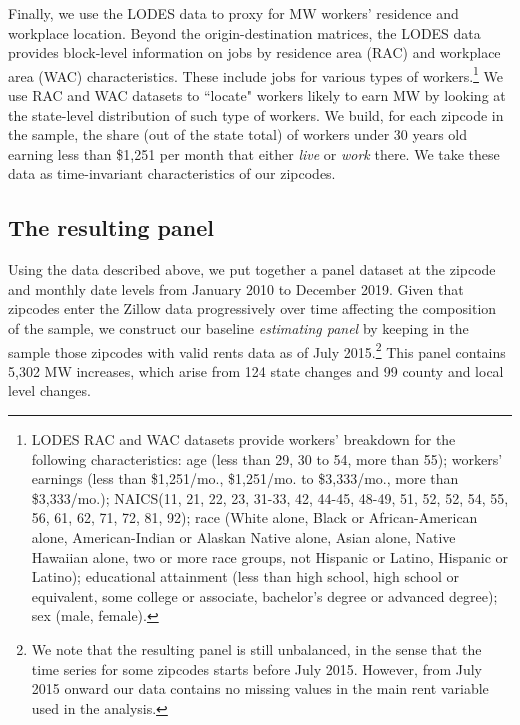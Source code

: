 Finally, we use the LODES data to proxy for MW workers' residence and workplace location. 
Beyond the origin-destination matrices, the LODES data provides block-level information on 
jobs by residence area (RAC) and workplace area (WAC) characteristics. These include jobs 
for various types of workers.\footnote{LODES RAC and WAC datasets provide workers' breakdown 
	for the following characteristics: age (less than 29, 30 to 54, more than 55); workers' 
	earnings (less than \$1,251/mo., \$1,251/mo. to \$3,333/mo., more than \$3,333/mo.); 
	NAICS(11, 21, 22, 23, 31-33, 42, 44-45, 48-49, 51, 52, 52, 54, 55, 56, 61, 62, 71, 72, 
	81, 92); race (White alone, Black or African-American alone, American-Indian or Alaskan 	
	Native alone, Asian alone, Native Hawaiian alone, two or more race groups, not Hispanic 
	or Latino, Hispanic or Latino); educational attainment (less than high school, high 
	school or equivalent, some college or associate, bachelor's degree or advanced degree); 
	sex (male, female).} 
We use RAC and WAC datasets to ``locate" workers likely to earn MW by looking at the 
state-level distribution of such type of workers. We build, for each zipcode in the sample, 
the share (out of the state total) of workers under 30 years old earning less than \$1,251 
per month that either \textit{live} or \textit{work} there. We take these data as 
time-invariant characteristics of our zipcodes.


\subsection{The resulting panel}

Using the data described above, we put together a panel dataset at the zipcode and monthly 
date levels from January 2010 to December 2019. Given that zipcodes enter the Zillow data 
progressively over time affecting the composition of the sample, we construct our baseline 
\textit{estimating panel} by keeping in the sample those zipcodes with valid rents data as 
of July 2015.\footnote{We note that the resulting panel is still unbalanced, in the sense 
	that the time series for some zipcodes starts before July 2015. However, from July
	2015 onward our data contains no missing values in the main rent variable used in the 
	analysis.} 
This panel contains 5,302 MW increases, which arise from 124 state changes 
and 99 county and local level changes.

